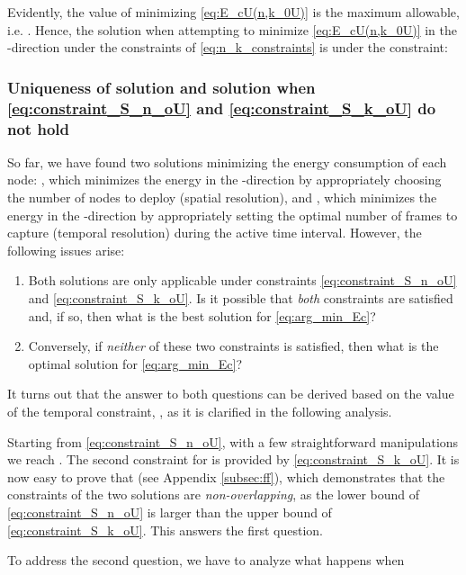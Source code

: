 \documentclass[twocolumn,english]{IEEEtran}
\theoremstyle{plain}
\theoremstyle{definition}
\begin{document}
\noindent Evidently, the value of  minimizing \eqref{eq:E_cU(n,k_0U)}
is the maximum allowable, i.e. . Hence, the
solution when attempting to minimize \eqref{eq:E_cU(n,k_0U)} in the
-direction under the constraints of \eqref{eq:n_k_constraints}
is 
under the constraint: 




\subsubsection{Uniqueness of solution and solution when \eqref{eq:constraint_S_n_oU}
and \eqref{eq:constraint_S_k_oU} do not hold}

So far, we have found two solutions minimizing the energy consumption
of each node: ,
which minimizes the energy in the -direction by appropriately
choosing the number of nodes to deploy (spatial resolution), and ,
which minimizes the energy in the -direction by appropriately
setting the optimal number of frames to capture (temporal resolution)
during the active time interval. However, the following issues arise: 

\begin{enumerate}[leftmargin=*] 
\item Both solutions are only applicable under constraints \eqref{eq:constraint_S_n_oU}
and \eqref{eq:constraint_S_k_oU}. Is it possible that \emph{both}
constraints are satisfied and, if so, then what is the best solution
for \eqref{eq:arg_min_Ec}? 

\item Conversely, if \emph{neither} of these two constraints is satisfied,
then what is the optimal solution for \eqref{eq:arg_min_Ec}? 

\end{enumerate}

It turns out that the answer to both questions can be derived based
on the value of the temporal constraint, , as it
is clarified in the following analysis.

Starting from \eqref{eq:constraint_S_n_oU}, with a few straightforward
manipulations we reach .
The second constraint for  is provided by \eqref{eq:constraint_S_k_oU}.
It is now easy to prove that 
(see Appendix \ref{subsec:ff}), which demonstrates that the constraints
of the two solutions are \emph{non-overlapping}, as the lower bound
of \eqref{eq:constraint_S_n_oU} is larger than the upper bound of
\eqref{eq:constraint_S_k_oU}. This answers the first question.

To address the second question, we have to analyze what happens when
\end{document}
